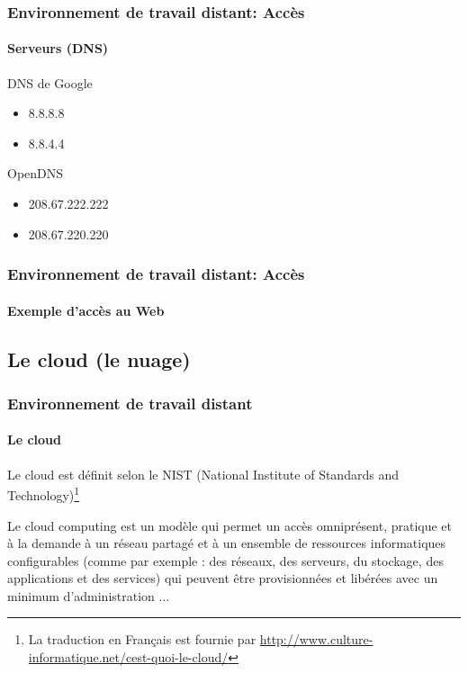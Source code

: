 \documentclass[xcolor=table]{beamer}
\begin{document}
\begin{frame}
\frametitle{Environnement de travail distant: Accès}
\framesubtitle{Serveurs (DNS)}

\begin{minipage}{0.65\textwidth}
\end{minipage}
%
\begin{minipage}{0.30\textwidth}
	DNS de Google
	\begin{itemize}
		\item 8.8.8.8
		\item 8.8.4.4
	\end{itemize}

	OpenDNS
	\begin{itemize}
		\item 208.67.222.222
		\item 208.67.220.220
	\end{itemize}

\end{minipage}

\end{frame}

\begin{frame}
\frametitle{Environnement de travail distant: Accès}
\framesubtitle{Exemple d'accès au Web}


\end{frame}


%
%
%
%


\subsection{Le cloud (le nuage)}

\begin{frame}
\frametitle{Environnement de travail distant}
\framesubtitle{Le cloud}

Le cloud est définit selon le NIST (National Institute of Standards and Technology)\footnote{La traduction en Français est fournie par \url{http://www.culture-informatique.net/cest-quoi-le-cloud/}}
\begin{definition}
	Le cloud computing est un modèle qui permet un accès omniprésent, pratique et à la demande à un réseau partagé et à un ensemble de ressources informatiques configurables (comme par exemple : des réseaux, des serveurs, du stockage, des applications et des services) qui peuvent être provisionnées et libérées avec un minimum d’administration ...
\end{definition}

\end{frame}
\end{document}
